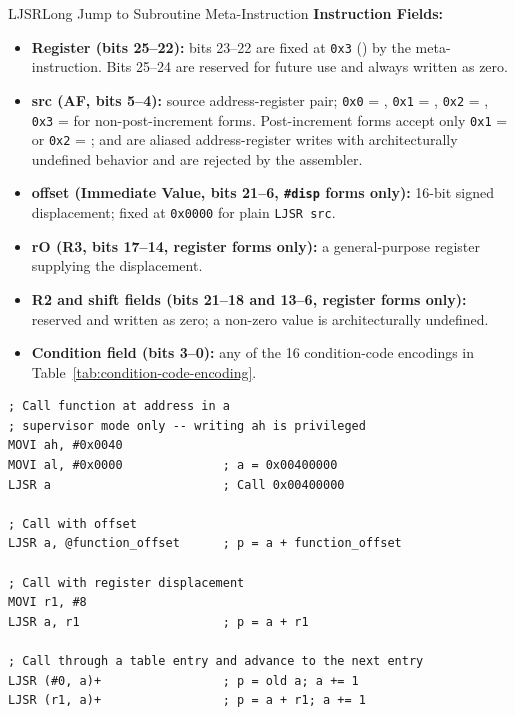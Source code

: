 \begin{instructionbox}{LJSR}{Long Jump to Subroutine Meta-Instruction}
	\textbf{Instruction Fields:}
	\begin{itemize}
		\item \textbf{Register (bits 25--22):} bits 23--22 are fixed at \texttt{0x3} () by the
		      meta-instruction. Bits 25--24 are reserved for future use and always written as zero.
		\item \textbf{src (AF, bits 5--4):} source address-register pair; \texttt{0x0} = , \texttt{0x1} =
		      , \texttt{0x2} = , \texttt{0x3} =  for non-post-increment forms. Post-increment forms
		      accept only \texttt{0x1} =  or \texttt{0x2} = ;  and  are aliased
		      address-register writes with architecturally undefined behavior and are rejected by the assembler.
		\item \textbf{offset (Immediate Value, bits 21--6, \texttt{\#disp} forms only):} 16-bit signed displacement; fixed at
		      \texttt{0x0000} for plain \texttt{LJSR src}.
		\item \textbf{rO (R3, bits 17--14, register forms only):} a general-purpose register supplying the displacement.
		\item \textbf{R2 and shift fields (bits 21--18 and 13--6, register forms only):} reserved and written as zero; a
		      non-zero value is architecturally undefined.
		\item \textbf{Condition field (bits 3--0):} any of the 16 condition-code encodings in
		      Table~\ref{tab:condition-code-encoding}.
	\end{itemize}

	\begin{example}
		\begin{lstlisting}
; Call function at address in a
; supervisor mode only -- writing ah is privileged
MOVI ah, #0x0040
MOVI al, #0x0000              ; a = 0x00400000
LJSR a                        ; Call 0x00400000

; Call with offset
LJSR a, @function_offset      ; p = a + function_offset

; Call with register displacement
MOVI r1, #8
LJSR a, r1                    ; p = a + r1

; Call through a table entry and advance to the next entry
LJSR (#0, a)+                 ; p = old a; a += 1
LJSR (r1, a)+                 ; p = a + r1; a += 1
		\end{lstlisting}
		\caption{Calling Through a Register with LJSR}
	\end{example}
\end{instructionbox}

